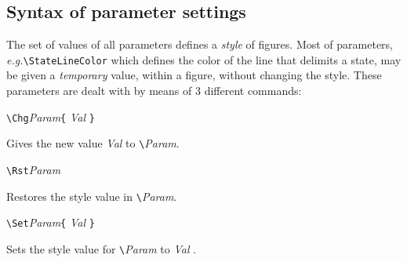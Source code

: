 \documentclass[11pt,twoside]{article}
\newlength{\ColoText}%
\newlength{\ColoFigu}%
\newlength{\parindenttemp} %
\newcommand{\noi}{\noindent}
\newcommand{\eg}{{\itshape e.g.}\xspace }
\newlength{\jsIndent}%
\begin{document}
\subsection{Syntax of parameter settings}
\label{sec.syn}

The set of values of all parameters defines a \emph{style} of figures.
Most of parameters, \eg \verb+\StateLineColor+ which defines the 
color of the line  
that delimits a state, may be given a \emph{temporary} value, within a 
figure, without changing the style.
These parameters are dealt with by means of 3 different commands:

\noi 
\begin{minipage}[t]{\ColoText}
        \par\vspace*{0mm}%
        \footnotesize
\verb+\Chg+\textsl{Param}\verb+{+ \textsl{Val} \verb+}+
   \end{minipage}%
\hspace*{1.2em}%
\begin{minipage}[t]{\ColoFigu}%
\par\vspace*{0mm}%
Gives the new value \textsl{Val} to \verb+\+\emph{Param}.
\end{minipage}%

\noi 
\begin{minipage}[t]{\ColoText}
        \par\vspace*{0mm}%
        \footnotesize
\verb+\Rst+\textsl{Param} 
   \end{minipage}%
\hspace*{1.2em}%
\begin{minipage}[t]{\ColoFigu}%
\par\vspace*{0mm}%
Restores the style value in \verb+\+\emph{Param}.
\end{minipage}%

\noi 
\begin{minipage}[t]{\ColoText}
        \par\vspace*{0mm}%
        \footnotesize
\verb+\Set+\textsl{Param}\verb+{+ \textsl{Val} \verb+}+
   \end{minipage}%
\hspace*{1.2em}%
\begin{minipage}[t]{\ColoFigu}%
\par\vspace*{0mm}%
Sets the style value for \verb+\+\emph{Param} to \textsl{Val} .
\end{minipage}%
\end{document}

